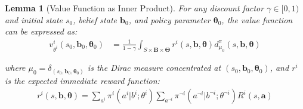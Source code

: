 \documentclass[a4paper,12pt]{report}
\newtheorem{lemma}{Lemma}
\begin{document}
\begin{lemma}[Value Function as Inner Product]
    For any discount factor $\gamma \in [0,1)$ and initial state $s_{0}$, belief
    state $\boldsymbol{b}_{0}$, and policy parameter $\boldsymbol{\theta}_{0}$,
    the value function can be expressed as:
    \begin{align}
        v^{i}_{\theta^i}(s_{0}, \boldsymbol{b}_{0}, \boldsymbol{\theta}_{0}) & = \frac{1}{1-\gamma}\int_{S \times \boldsymbol{B} \times \boldsymbol{\Theta}}r^{i}(s, \boldsymbol{b}, \boldsymbol{\theta}) d^{\pi}_{\mu_0}(s, \boldsymbol{b}, \boldsymbol{\theta})
    \end{align}

    where $\mu_{0} = \delta_{(s_0, \boldsymbol{b}_0, \boldsymbol{\theta}_0)}$ is
    the Dirac measure concentrated at
    $(s_{0}, \boldsymbol{b}_{0}, \boldsymbol{\theta}_{0})$, and $r^{i}$ is the expected
    immediate reward function:
    \begin{align}
        r^{i}(s, \boldsymbol{b}, \boldsymbol{\theta}) = \sum_{a^i}\pi^{i}(a^{i}|b^{i}; \theta^{i}) \sum_{a^{\neg i}}\pi^{\neg i}(a^{\neg i}|b^{\neg i}; \theta^{\neg i}) R^{i}(s, \boldsymbol{a})
    \end{align}
\end{lemma}
\end{document}
